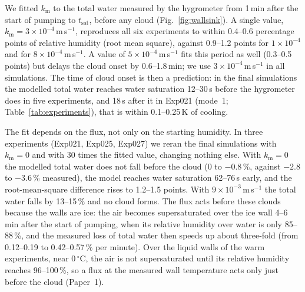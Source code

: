 We fitted $k_\mathrm{m}$ to the total water measured by the hygrometer from 1\,min after the start of pumping to $t_\mathrm{sat}$, before any cloud (Fig.~\ref{fig:wallsink}). A single value, $k_\mathrm{m} = 3\times10^{-4}$\,m\,s$^{-1}$, reproduces all six experiments to within 0.4--0.6 percentage points of relative humidity (root mean square), against 0.9--1.2 points for $1\times10^{-4}$ and for $8\times10^{-4}$\,m\,s$^{-1}$. A value of $5\times10^{-4}$\,m\,s$^{-1}$ fits this period as well (0.3--0.5 points) but delays the cloud onset by 0.6--1.8\,min; we use $3\times10^{-4}$\,m\,s$^{-1}$ in all simulations. The time of cloud onset is then a prediction: in the final simulations the modelled total water reaches water saturation 12--30\,s before the hygrometer does in five experiments, and 18\,s after it in Exp021 (mode~1; Table~\ref{tab:experiments}), that is within 0.1--0.25\,K of cooling.

The fit depends on the flux, not only on the starting humidity. In three experiments (Exp021, Exp025, Exp027) we reran the final simulations with $k_\mathrm{m} = 0$ and with 30 times the fitted value, changing nothing else. With $k_\mathrm{m} = 0$ the modelled total water does not fall before the cloud (0 to $-0.8$\,\%, against $-2.8$ to $-3.6$\,\% measured), the model reaches water saturation 62--76\,s early, and the root-mean-square difference rises to 1.2--1.5 points. With $9\times10^{-3}$\,m\,s$^{-1}$ the total water falls by 13--15\,\% and no cloud forms. The flux acts before these clouds because the walls are ice: the air becomes supersaturated over the ice wall 4--6\,min after the start of pumping, when its relative humidity over water is only 85--88\,\%, and the measured loss of total water then speeds up about three-fold (from 0.12--0.19 to 0.42--0.57\,\% per minute). Over the liquid walls of the warm experiments, near 0\,$^\circ$C, the air is not supersaturated until its relative humidity reaches 96--100\,\%, so a flux at the measured wall temperature acts only just before the cloud (Paper~1).

